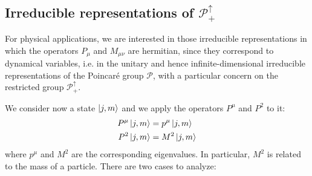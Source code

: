 \documentclass[../../main/main.tex]{subfiles}
\begin{document}
\subsection{Irreducible representations of \( \mathcal{P}^{\uparrow}_{+} \) }
For physical applications, we are interested in those irreducible representations in which the operators \( P_\mu \) and \( M_{\mu \nu} \) are hermitian, since they correspond to dynamical variables, i.e. in the unitary and hence infinite-dimensional irreducible representations of the Poincaré group \( \mathcal{P} \), with a particular concern on the restricted group \( \mathcal{P}^{\uparrow}_{+} \).

We consider now a state \( \ket{j,m}  \) and we apply the operators \( P^\mu \) and \( P^2 \) to it:
\begin{subequations}
    \begin{align}
        P^\mu \ket{j,m}  &= p^\mu \ket{j,m} \\
        P^2 \ket{j,m} &= M^2 \ket{j,m}
    \end{align}
    \label{}
\end{subequations}
where \( p^\mu \) and \( M^2 \) are the corresponding eigenvalues. In particular, \( M^2 \) is related to the mass of a particle. There are two cases to analyze:
\end{document}
